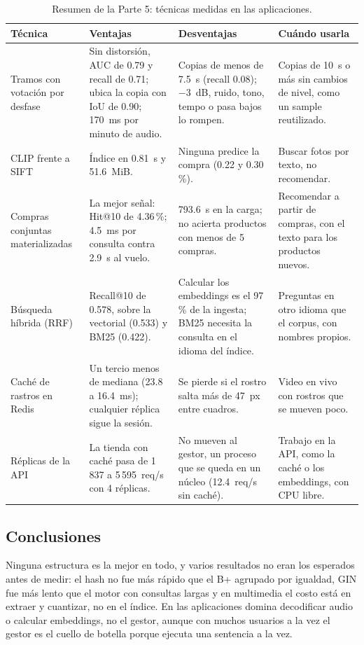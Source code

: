 
\begin{table}[H]
\centering
\caption{Resumen de la Parte 5: técnicas medidas en las aplicaciones.}\label{tab:resumen-apps}
\small
\begin{tabular}{@{}L{2.8cm}L{4.5cm}L{4.5cm}L{4.0cm}@{}}
\toprule
\textbf{Técnica} & \textbf{Ventajas} & \textbf{Desventajas} & \textbf{Cuándo usarla} \\
\midrule
Tramos con votación por desfase & Sin distorsión, AUC de 0.79 y recall de 0.71; ubica la copia con IoU de 0.90; 170~ms por minuto de audio. & Copias de menos de 7.5~s (recall 0.08); $-3$~dB, ruido, tono, tempo o pasa bajos lo rompen. & Copias de 10~s o más sin cambios de nivel, como un sample reutilizado. \\
CLIP frente a SIFT & Índice en 0.81~s y 51.6~MiB. & Ninguna predice la compra (0.22 y 0.30\,\%). & Buscar fotos por texto, no recomendar. \\
Compras conjuntas materializadas & La mejor señal: Hit@10 de 4.36\,\%; 4.5~ms por consulta contra 2.9~s al vuelo. & 793.6~s en la carga; no acierta productos con menos de 5 compras. & Recomendar a partir de compras, con el texto para los productos nuevos. \\
Búsqueda híbrida (RRF) & Recall@10 de 0.578, sobre la vectorial (0.533) y BM25 (0.422). & Calcular los embeddings es el 97\,\% de la ingesta; BM25 necesita la consulta en el idioma del índice. & Preguntas en otro idioma que el corpus, con nombres propios. \\
Caché de rastros en Redis & Un tercio menos de mediana (23.8 a 16.4~ms); cualquier réplica sigue la sesión. & Se pierde si el rostro salta más de 47~px entre cuadros. & Video en vivo con rostros que se mueven poco. \\
Réplicas de la API & La tienda con caché pasa de 1\,837 a 5\,595~req/s con 4 réplicas. & No mueven al gestor, un proceso que se queda en un núcleo (12.4~req/s sin caché). & Trabajo en la API, como la caché o los embeddings, con CPU libre. \\
\bottomrule
\end{tabular}
\end{table}

\FloatBarrier
\subsection{Conclusiones}

Ninguna estructura es la mejor en todo, y varios resultados no eran los esperados antes de
medir: el hash no fue más rápido que el B+ agrupado por igualdad, GIN fue más lento que el
motor con consultas largas y en multimedia el costo está en extraer y cuantizar, no en el
índice. En las aplicaciones domina decodificar audio o calcular embeddings, no el gestor, aunque
con muchos usuarios a la vez el gestor es el cuello de botella porque ejecuta una sentencia
a la vez.
